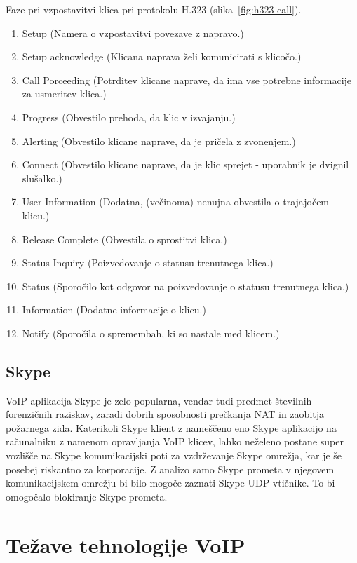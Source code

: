 \documentclass{acm_proc_article-sp}
\begin{document}
Faze pri vzpostavitvi klica pri protokolu H.323 (slika~\ref{fig:h323-call}).
\begin{enumerate}
  \item Setup (Namera o vzpostavitvi povezave z napravo.)
  \item Setup acknowledge (Klicana naprava želi komunicirati s klicočo.)
  \item Call Porceeding (Potrditev klicane naprave, da ima vse potrebne informacije za usmeritev klica.)
  \item Progress (Obvestilo prehoda, da klic v izvajanju.)
  \item Alerting (Obvestilo klicane naprave, da je pričela z zvonenjem.)
  \item Connect (Obvestilo klicane naprave, da je klic sprejet - uporabnik je dvignil slušalko.)
  \item User Information (Dodatna, (večinoma) nenujna obvestila o trajajočem klicu.)
  \item Release Complete (Obvestila o sprostitvi klica.)
  \item Status Inquiry (Poizvedovanje o statusu trenutnega klica.)
  \item Status (Sporočilo kot odgovor na poizvedovanje o statusu trenutnega klica.)
  \item Information (Dodatne informacije o klicu.)
  \item Notify (Sporočila o spremembah, ki so nastale med klicem.)
\end{enumerate}


\subsection{Skype}
VoIP aplikacija Skype je zelo popularna, vendar tudi predmet številnih forenzičnih raziskav, zaradi dobrih sposobnosti prečkanja NAT in zaobitja požarnega zida. Katerikoli Skype klient z nameščeno eno Skype aplikacijo na računalniku z namenom opravljanja VoIP klicev, lahko neželeno postane super vozlišče na Skype komunikacijski poti za vzdrževanje Skype omrežja, kar je še posebej riskantno za korporacije. Z analizo samo Skype prometa v njegovem komunikacijskem omrežju bi bilo mogoče zaznati Skype UDP vtičnike. To bi omogočalo blokiranje Skype prometa.

\section{Težave tehnologije VoIP}
\end{document}

